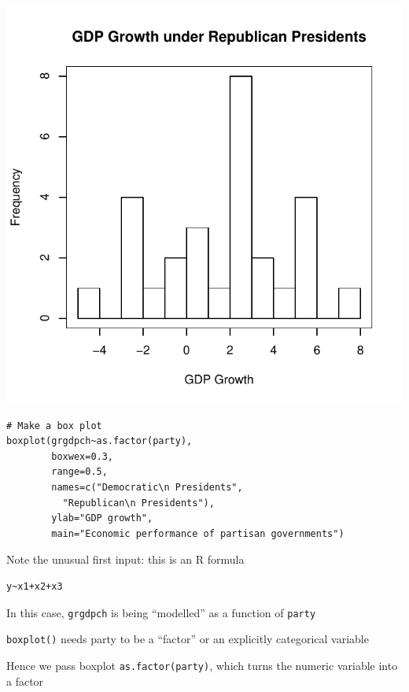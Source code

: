 \documentclass[pdflatex,landscape,titlepage]{foils}
\begin{document}
\begin{center}
\color{black}
\includegraphics[width=7.5 in]{gdphist_rep}
\color{white}
\end{center}

\foilhead[-0.75in]{}
\bgclear

\begin{verbatim}
# Make a box plot
boxplot(grgdpch~as.factor(party),
        boxwex=0.3,
        range=0.5,
        names=c("Democratic\n Presidents",
          "Republican\n Presidents"),
        ylab="GDP growth",
        main="Economic performance of partisan governments")
\end{verbatim}

Note the unusual first input:  this is an R formula
\begin{verbatim}
y~x1+x2+x3
\end{verbatim}

In this case, \texttt{grgdpch} is being ``modelled'' as a function of \texttt{party}

\texttt{boxplot()} needs party to be a ``factor'' or an explicitly categorical variable

Hence we pass boxplot \texttt{as.factor(party)}, which turns the numeric variable into a factor
\end{document}
